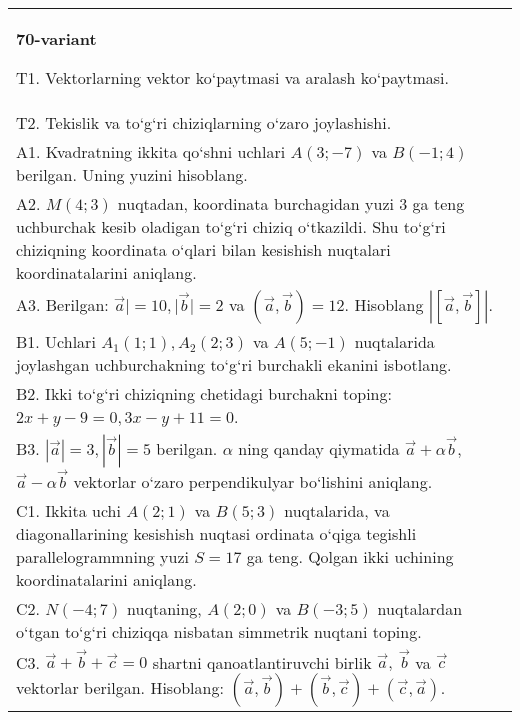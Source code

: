 \documentclass{article}
\begin{document}
\begin{tabular}{m{17cm}}
\textbf{70-variant}
\newline

T1. 
Vektorlarning vektor ko‘paytmasi va aralash ko‘paytmasi.
 \\
T2. 
Tekislik va to‘g‘ri chiziqlarning o‘zaro joylashishi.
 \\
A1. 
Kvadratning ikkita qo‘shni uchlari $A (3; -7)$ va
$B (-1;4) $ berilgan. Uning yuzini hisoblang.
 \\
A2. 
$M (4;3) $ nuqtadan, koordinata burchagidan
yuzi 3 ga teng uchburchak kesib oladigan to‘g‘ri chiziq o‘tkazildi.
Shu to‘g‘ri chiziqning koordinata o‘qlari bilan kesishish nuqtalari
koordinatalarini aniqlang.
 \\
A3. 
Berilgan: $\overrightarrow{a}| = 10,|\overrightarrow{b}| = 2$ va
$\left(\overrightarrow{a},\overrightarrow{b} \right) = 12$. Hisoblang
$\left| \left\lbrack \overrightarrow{a},\overrightarrow{b} \right\rbrack \right|$.
 \\
B1. 
Uchlari $A_1 (1; 1), A_2 (2; 3) $ va $A (5;-1) $
nuqtalarida joylashgan uchburchakning to‘g‘ri burchakli ekanini isbotlang.
 \\
B2. 
Ikki to‘g‘ri chiziqning chetidagi burchakni toping: $2x+y-9=0, 3x-y+11=0$.
 \\
B3. 
$|\vec{a}| = 3,|\vec{b}| = 5$ berilgan. $\alpha$ ning qanday qiymatida $\vec{a} + \alpha\vec{b}$, $\vec{a} - \alpha\vec{b}$ vektorlar o‘zaro perpendikulyar bo‘lishini aniqlang.
 \\
C1. 
Ikkita uchi \(A (2;1) \) va \(B (5; 3) \) nuqtalarida, va
diagonallarining kesishish nuqtasi ordinata o‘qiga tegishli
parallelogrammning yuzi \(S = 17\) ga teng. Qolgan ikki uchining
koordinatalarini aniqlang. \\
C2. 
\(N (- 4; 7) \) nuqtaning, \(A (2;0) \) va \(B (- 3;5) \)
nuqtalardan o‘tgan to‘g‘ri chiziqqa nisbatan simmetrik nuqtani toping.
 \\
C3. \(\vec{a} + \vec{b} + \vec{c} = 0\) shartni qanoatlantiruvchi birlik \(\vec{a},\ \vec{b}\) va \(\vec{c}\) vektorlar berilgan. Hisoblang: \(\left(\vec{a},\vec{b} \right) + \left(\vec{b},\vec{c} \right) + \left(\vec{c},\vec{a} \right) \).
 \\

\end{tabular}
\vspace{1cm}
\end{document}
